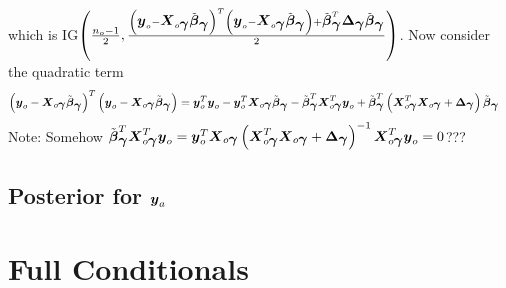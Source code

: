 \documentclass[fleqn]{article}
\def\bm#1{\mbox{\boldmath $#1$}}
\begin{document}
%
which is IG$\left( \frac{n_o - 1} {2}, \frac{ \left( \bm{y}_o - \bm{X}_{o \bm{\gamma}} \tilde{\bm{\beta}}_{\bm{\gamma}} \right)^T \left( \bm{y}_o - \bm{X}_{o \bm{\gamma}} \tilde{\bm{\beta}}_{\bm{\gamma}} \right) + \tilde{\bm{\beta}}_{\bm{\gamma}}^T \bm{\Delta}_{\bm{\gamma}} \tilde{\bm{\beta}}_{\bm{\gamma}} } {2} \right)$. Now consider the quadratic term 
%
\begin{align*}
%
\left( \bm{y}_o - \bm{X}_{o \bm{\gamma}} \tilde{\bm{\beta}}_{\bm{\gamma}} \right)^T \left( \bm{y}_o - \bm{X}_{o \bm{\gamma}} \tilde{\bm{\beta}}_{\bm{\gamma}} \right) & = \bm{y}_o^T \bm{y}_o - \bm{y}_o^T \bm{X}_{o \bm{\gamma}} \tilde{\bm{\beta}}_{\bm{\gamma}} - \tilde{\bm{\beta}}_{\bm{\gamma}}^T \bm{X}_{o \bm{\gamma}}^T \bm{y}_o + \tilde{\bm{\beta}}_{\bm{\gamma}}^T \left( \bm{X}_{o \bm{\gamma}}^T \bm{X}_{o \bm{\gamma}} + \bm{\Delta}_{\bm{\gamma}} \right) \tilde{\bm{\beta}}_{\bm{\gamma}}
%
\end{align*}
%
Note: Somehow $\tilde{\bm{\beta}}_{\bm{\gamma}}^T \bm{X}_{o \bm{\gamma}}^T \bm{y}_o = \bm{y}_o^T \bm{X}_{o \bm{\gamma}} \left( \bm{X}_{ o \bm{\gamma}}^T \bm{X}_{o \bm{\gamma}} + \bm{\Delta}_{\bm{\gamma}} \right)^{ - 1} \bm{X}_{o \bm{\gamma}}^T \bm{y}_o = 0$???
\subsection{Posterior for $\bm{y}_a$}
\section{Full Conditionals}
\end{document}
